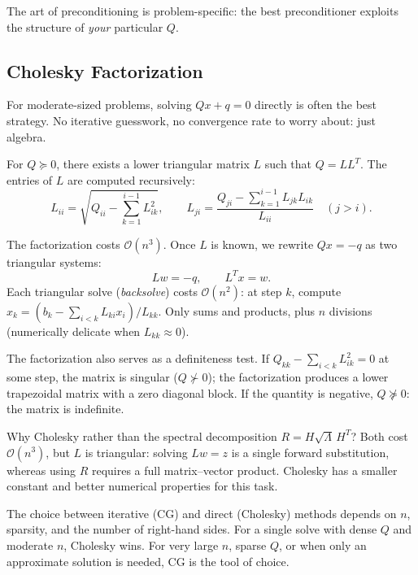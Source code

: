 The art of preconditioning is problem-specific: the best preconditioner exploits the structure of \emph{your} particular $Q$.


\subsection{Cholesky Factorization}\label{sec:cholesky}

For moderate-sized problems, solving $Qx + q = 0$ directly is often the best strategy.
No iterative guesswork, no convergence rate to worry about: just algebra.

\begin{definition}\label{def:cholesky}
	For $Q \succeq 0$, there exists a lower triangular matrix $L$ such that $Q = L L^T$.
	The entries of $L$ are computed recursively:
	\begin{equation}\label{eq:cholesky-entries}
		L_{ii} = \sqrt{Q_{ii} - \sum_{k=1}^{i-1} L_{ik}^2},
		\qquad
		L_{ji} = \frac{Q_{ji} - \sum_{k=1}^{i-1} L_{jk} L_{ik}}{L_{ii}}
		\quad (j > i).
	\end{equation}
\end{definition}

The factorization costs $\mathcal{O}(n^3)$.
Once $L$ is known, we rewrite $Qx = -q$ as two triangular systems:
\begin{equation}\label{eq:cholesky-solve}
	L w = -q, \qquad L^T x = w.
\end{equation}
Each triangular solve (\emph{backsolve}) costs $\mathcal{O}(n^2)$: at step $k$, compute $x_k = (b_k - \sum_{i < k} L_{ki} x_i) / L_{kk}$.
Only sums and products, plus $n$ divisions (numerically delicate when $L_{kk} \approx 0$).

The factorization also serves as a definiteness test.
If $Q_{kk} - \sum_{i<k} L_{ik}^2 = 0$ at some step, the matrix is singular ($Q \not\succ 0$); the factorization produces a lower trapezoidal matrix with a zero diagonal block.
If the quantity is negative, $Q \not\succeq 0$: the matrix is indefinite.

Why Cholesky rather than the spectral decomposition $R = H\sqrt{\Lambda}\, H^T$?
Both cost $\mathcal{O}(n^3)$, but $L$ is triangular: solving $Lw = z$ is a single forward substitution, whereas using $R$ requires a full matrix--vector product.
Cholesky has a smaller constant and better numerical properties for this task.

The choice between iterative (CG) and direct (Cholesky) methods depends on $n$, sparsity, and the number of right-hand sides.
For a single solve with dense $Q$ and moderate $n$, Cholesky wins.
For very large $n$, sparse $Q$, or when only an approximate solution is needed, CG is the tool of choice.